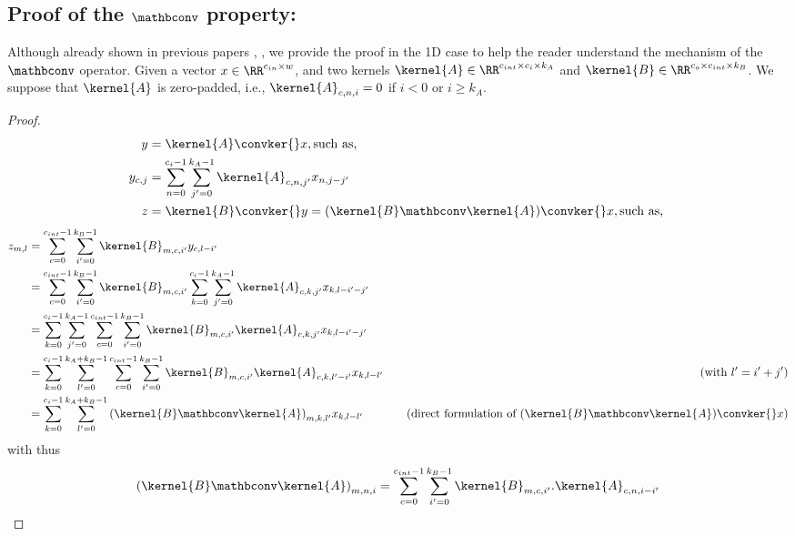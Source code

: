     \subsection{Proof of the $\mathbconv$ property:}\label{sec:ap_proofs_mathbconv}
        Although already shown in previous papers \cite{li_preventing_2019}, \cite{xiao_dynamical_2018}, we provide the proof in the 1D case to help the reader understand the mechanism of the $\mathbconv$ operator.
        Given a vector $x\in\RR^{c_{in}\times w}$, and two kernels $\kernel{A}\in\RR^{c_{int}\times c_i \times k_A}$ and $\kernel{B}\in\RR^{c_o\times c_{int} \times k_B}$. We suppose that $\kernel{A}$ is zero-padded, i.e., $\kernel{A}_{c,n,i} = 0$ if $i<0$ or $i\geq k_A$.
    \begin{proof}
    \begin{align*}
            y &= \kernel{A}\convker{}x,\text{such as,  } \\ 
            y_{c,j}&=\sum_{n = 0}^{c_i-1}\sum_{j' = 0}^{k_A-1}\kernel{A}_{c,n,j'}x_{n,j-j'}\\
    		z &= \kernel{B}\convker{}y=(\kernel{B}\mathbconv \kernel{A})\convker{}x,\text{such as,  }
    \end{align*}
    \begin{align*}
      z_{m,l}&=\sum_{c = 0}^{c_{int}-1}\sum_{i' = 0}^{k_B-1}\kernel{B}_{m,c,i'}y_{c,l-i'}\\
    		&=\sum_{c = 0}^{c_{int}-1}\sum_{i' = 0}^{k_B-1}\kernel{B}_{m,c,i'}\sum_{k = 0}^{c_i-1}\sum_{j' = 0}^{k_A-1}\kernel{A}_{c,k,j'}x_{k,l-i'-j'}\\
    		&= \sum_{k = 0}^{c_i-1}\sum_{j' = 0}^{k_A-1}\sum_{c = 0}^{c_{int}-1}\sum_{i' = 0}^{k_B-1}\kernel{B}_{m,c,i'}\kernel{A}_{c,k,j'}x_{k,l-i'-j'}\\
      &= \sum_{k = 0}^{c_i-1}\sum_{l' = 0}^{k_A+k_B-1}\sum_{c = 0}^{c_{int}-1}\sum_{i' = 0}^{k_B-1}\kernel{B}_{m,c,i'}\kernel{A}_{c,k,l'-i'}x_{k,l-l'}   &\quad (\text{with } l'=i'+j')\\
    		&= \sum_{k = 0}^{c_i-1}\sum_{l' = 0}^{k_A+k_B-1}{(\kernel{B}\mathbconv \kernel{A})}_{m,k,l'}x_{k,l-l'}   &\quad (\text{direct formulation of } (\kernel{B}\mathbconv \kernel{A})\convker{}x)
    \end{align*}
      with thus
      \[
      {(\kernel{B}\mathbconv \kernel{A})}_{m,n,i} = \sum_{c = 0}^{c_{int}-1}\sum_{i' = 0}^{k_B-1} \kernel{B}_{m,c,i'} . \kernel{A}_{c,n,i-i'}
      \]
\end{proof}



